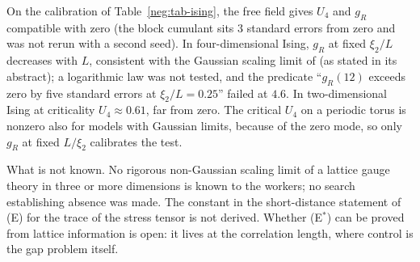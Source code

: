 \begin{observation}\label{neg:obs-ising}
On the calibration of Table~\ref{neg:tab-ising}, the free field gives $U_4$ and $g_R$ compatible
with zero (the block cumulant sits $3$ standard errors from zero and was not rerun with a second
seed). In four-dimensional Ising, $g_R$ at fixed $\xi_2/L$ decreases with $L$, consistent with
the Gaussian scaling limit of \cite{ADC21} (as stated in its abstract); a logarithmic law was not
tested, and the predicate ``$g_R(12)$ exceeds zero by five standard errors at $\xi_2/L=0.25$''
failed at $4.6$. In two-dimensional Ising at criticality $U_4\approx0.61$, far from zero. The
critical $U_4$ on a periodic torus is nonzero also for models with Gaussian limits, because of
the zero mode, so only $g_R$ at fixed $L/\xi_2$ calibrates the test.
\end{observation}

What is not known. No rigorous non-Gaussian scaling limit of a lattice gauge theory in three or
more dimensions is known to the workers; no search establishing absence was made. The constant
in the short-distance statement of (E) for the trace of the stress tensor is not derived. Whether
(E$^*$) can be proved from lattice information is open: it lives at the correlation length,
where control is the gap problem itself.
